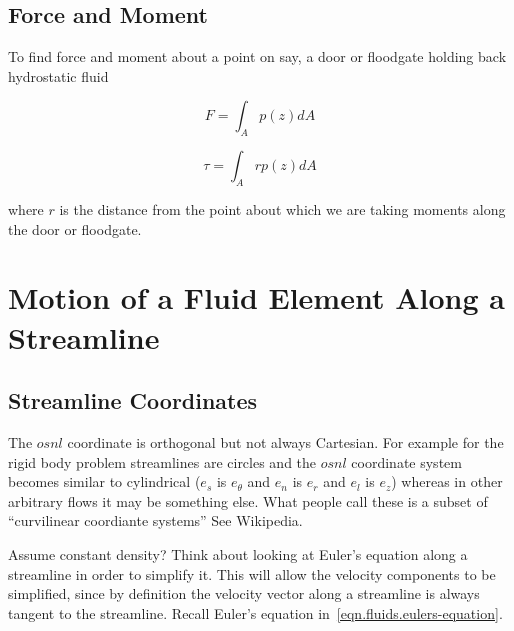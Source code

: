 \subsection{Force and Moment}
To find force and moment about a point on say, a door or floodgate holding back hydrostatic fluid

\begin{equation*}
  F=\int_{A}p(z)dA
\end{equation*}

\begin{equation*}
  \tau=\int_{A}rp(z)dA
\end{equation*}

where $r$ is the distance from the point about which we are taking moments along the door or floodgate.

\section{Motion of a Fluid Element Along a Streamline}

\subsection{Streamline Coordinates}

The $osnl$ coordinate is orthogonal but not always Cartesian.
For example for the rigid body problem streamlines are circles and the $osnl$ coordinate system becomes similar to cylindrical ($e_{s}$ is $e_{\theta}$ and $e_{n}$ is $e_{r}$ and $e_{l}$ is $e_{z}$) whereas in other arbitrary flows it may be something else.
What people call these is a subset of ``curvilinear coordiante systems'' See Wikipedia.

Assume constant density?
Think about looking at Euler's equation along a streamline in order to simplify it.
This will allow the velocity components to be simplified, since by definition the velocity vector along a streamline is always tangent to the streamline.
Recall Euler's equation in\ \eqref{eqn.fluids.eulers-equation}.

